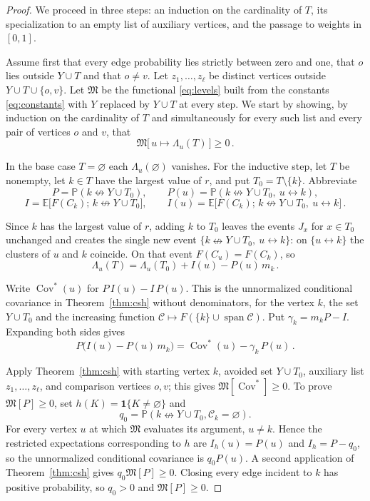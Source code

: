 \documentclass[11pt]{article}
\theoremstyle{definition}
\theoremstyle{remark}
\newcommand{\PP}{\mathbb P}
\newcommand{\EE}{\mathbb E}
\newcommand{\one}{\mathbf 1}
\newcommand{\con}{\leftrightarrow}
\newcommand{\ncon}{\nleftrightarrow}
\newcommand{\eC}{\mathcal C}
\DeclareMathOperator{\Cov}{Cov}
\DeclareMathOperator{\spn}{span}
\newcommand{\Marg}{\mathfrak M}
\begin{document}
\begin{proof}
We proceed in three steps: an induction on the cardinality of $T$, its specialization to an
empty list of auxiliary vertices, and the passage to weights in $[0,1]$.

Assume first that every edge probability lies strictly between zero and one, that $o$ lies
outside $Y\cup T$ and that $o\neq v$. Let $z_1,\dots,z_\ell$ be distinct vertices outside
$Y\cup T\cup\{o,v\}$. Let $\Marg$ be the functional \eqref{eq:levels} built from the
constants \eqref{eq:constants} with $Y$ replaced by $Y\cup T$ at every step. We start by
showing, by induction on the cardinality of $T$ and simultaneously for every such list and
every pair of vertices $o$ and $v$, that
\begin{equation}\label{eq:s5d}
 \Marg\bigl[\,u\mapsto\Lambda_u(T)\,\bigr]\geq 0\,.
\end{equation}

In the base case $T=\varnothing$ each $\Lambda_u(\varnothing)$ vanishes. For the inductive
step, let $T$ be nonempty, let $k\in T$ have the largest value of $r$, and put
$T_0=T\setminus\{k\}$. Abbreviate
\[
 P=\PP(k\ncon Y\cup T_0),\qquad P(u)=\PP(k\ncon Y\cup T_0,\ u\con k),
\]
\[
 I=\EE\bigl[F(C_k);\,k\ncon Y\cup T_0\bigr],\qquad
 I(u)=\EE\bigl[F(C_k);\,k\ncon Y\cup T_0,\ u\con k\bigr]\,.
\]

Since $k$ has the largest value of $r$, adding $k$ to $T_0$ leaves the events $J_x$ for
$x\in T_0$ unchanged and creates the single new event $\{k\ncon Y\cup T_0,\ u\con k\}$: on
$\{u\con k\}$ the clusters of $u$ and $k$ coincide. On that event $F(C_u)=F(C_k)$, so
\begin{equation}\label{eq:peel}
 \Lambda_u(T)=\Lambda_u(T_0)+I(u)-P(u)\,m_k\,.
\end{equation}

Write $\Cov^{\ast}(u)$ for $P\,I(u)-I\,P(u)$. This is the unnormalized conditional covariance in
Theorem~\ref{thm:csh} without denominators, for the vertex $k$, the set $Y\cup T_0$ and the
increasing function $\eC\mapsto F(\{k\}\cup\spn\eC)$. Put $\gamma_k=m_kP-I$. Expanding
both sides gives
\begin{equation}\label{eq:covid}
 P\bigl(I(u)-P(u)\,m_k\bigr)=\Cov^{\ast}(u)-\gamma_k\,P(u)\,.
\end{equation}

Apply Theorem~\ref{thm:csh} with starting vertex $k$, avoided set $Y\cup T_0$, auxiliary
list $z_1,\ldots,z_\ell$, and comparison vertices $o,v$; this gives
$\Marg[\Cov^{\ast}]\geq0$. To prove $\Marg[P]\geq0$, set
$h(K)=\one\{K\neq\varnothing\}$ and
\[
 q_0=\PP(k\ncon Y\cup T_0,\eC_k=\varnothing).
\]
For every vertex $u$ at which $\Marg$ evaluates its argument, $u\neq k$. Hence the
restricted expectations corresponding to $h$ are $I_h(u)=P(u)$ and $I_h=P-q_0$, so the
unnormalized conditional covariance is $q_0P(u)$. A second application of
Theorem~\ref{thm:csh} gives $q_0\Marg[P]\geq0$. Closing every edge incident to $k$ has
positive probability, so $q_0>0$ and $\Marg[P]\geq0$.


\end{proof}
\end{document}
